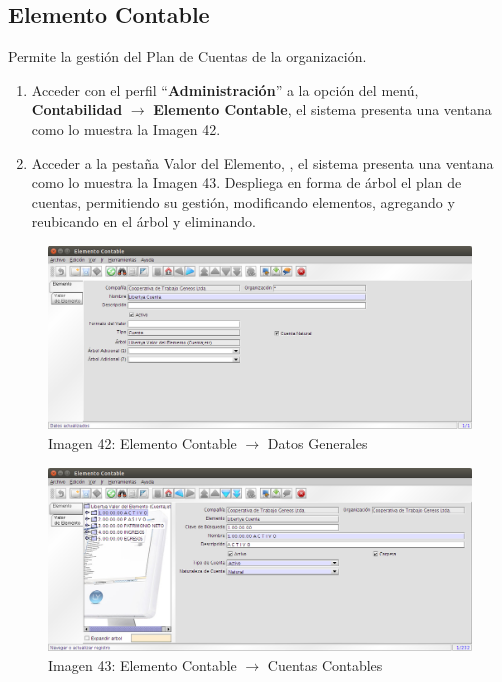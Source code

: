 \documentclass[letterpaper,10pt,spanish]{sphinxmanual}
\begin{document}
\subsection{Elemento Contable}
\label{contabilidad:elemento-contable}
Permite la gestión del Plan de Cuentas de la organización.
\begin{enumerate}
\item {} 
Acceder con el perfil ``\textbf{Administración}'' a la opción del menú, \textbf{Contabilidad} \(\rightarrow\) \textbf{Elemento Contable}, el sistema presenta una ventana como lo muestra la Imagen 42.

\item {} 
Acceder a la pestaña Valor del Elemento, , el sistema presenta una ventana como lo muestra la Imagen 43. Despliega en forma de árbol el plan de cuentas, permitiendo su gestión, modificando elementos, agregando y reubicando en el árbol y eliminando.

\end{enumerate}
\begin{figure}[htbp]
\centering
\capstart

\includegraphics{ly_contabilidad_42.png}
\caption{Imagen 42: Elemento Contable \(\rightarrow\) Datos Generales}\end{figure}
\begin{figure}[htbp]
\centering
\capstart

\includegraphics{ly_contabilidad_43.png}
\caption{Imagen 43: Elemento Contable \(\rightarrow\) Cuentas Contables}\end{figure}
\end{document}
